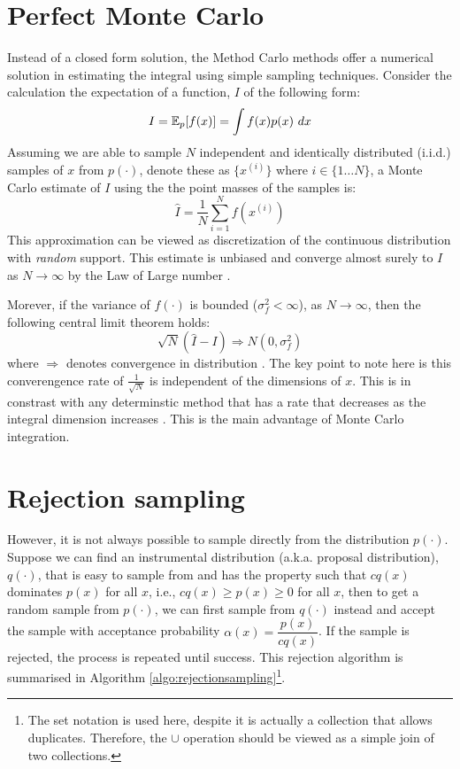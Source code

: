 \section{Perfect Monte Carlo}
Instead of a closed form solution, the Method Carlo methods offer a numerical solution in estimating the integral using simple sampling techniques. Consider the calculation the expectation of a function, $I$ of the following form:
\begin{equation}
  I = \operatorname{\mathbb{E}}_p[f(x)] = \int f(x)p(x)~dx
\label{eq:expectation}
\end{equation}
Assuming we are able to sample $N$ independent and identically distributed (i.i.d.) samples of $x$ from $p(\cdot)$, denote these as $\{x^{(i)}\}$ where $i \in \{1 \ldots N\}$, a Monte Carlo estimate of $I$ using the the point masses of the samples is:
\begin{equation}
  \hat{I} = \frac{1}{N} \sum^N_{i=1} f(x^{(i)})
\end{equation}
This approximation can be viewed as discretization of the continuous distribution with \emph{random} support. This estimate is unbiased and converge almost surely to $I$ as $N \to \infty$ by the Law of Large number \cite{RCP05}. 

Morever, if the variance of $f(\cdot)$ is bounded ($\sigma^2_f < \infty$), as $N \to \infty$, then the following central limit theorem holds:
\begin{equation}
  \sqrt{N}(\hat{I} - I) \Longrightarrow N(0, \sigma^2_f)
\end{equation}
where $\Longrightarrow$ denotes convergence in distribution \cite{AD09}. The key point to note here is this converengence rate of $\frac{1}{\sqrt{N}}$ is independent of the dimensions of $x$. This is in constrast with any determinstic method that has a rate that decreases as the integral dimension increases \cite{RCP05}. This is the main advantage of Monte Carlo integration.

\section{Rejection sampling}
However, it is not always possible to sample directly from the distribution $p(\cdot)$. Suppose we can find an instrumental distribution (a.k.a. proposal distribution), $q(\cdot)$, that is easy to sample from and has the property such that $cq(x)$ dominates $p(x)$ for all $x$, i.e., $cq(x) \geq p(x) \geq 0$ for all $x$, then to get a random sample from $p(\cdot)$, we can first sample from $q(\cdot)$ instead and accept the sample with acceptance probability $\alpha(x)=\dfrac{p(x)}{cq(x)}$. If the sample is rejected, the process is repeated until success. This rejection algorithm is summarised in Algorithm \ref{algo:rejectionsampling}\footnote{The set notation is used here, despite it is actually a collection that allows duplicates. Therefore, the $\cup$ operation should be viewed as a simple join of two collections.}.

